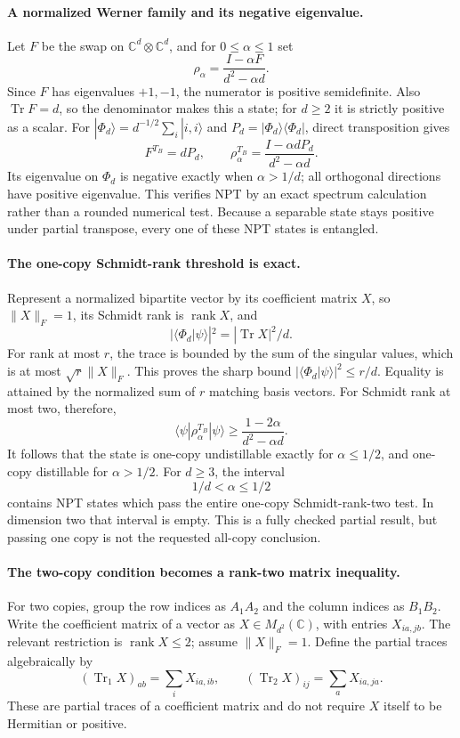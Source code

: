 \documentclass[11pt]{article}
\begin{document}
\paragraph{A normalized Werner family and its negative eigenvalue.}
Let $F$ be the swap on $\mathbb C^d\otimes\mathbb C^d$, and for
$0\le\alpha\le1$ set
\[
 \rho_\alpha=\frac{I-\alpha F}{d^2-\alpha d}.
\]
Since $F$ has eigenvalues $+1,-1$, the numerator is positive
semidefinite. Also $\operatorname{Tr}F=d$, so the denominator makes
this a state; for $d\ge2$ it is strictly positive as a scalar.
For $|\Phi_d\rangle=d^{-1/2}\sum_i|i,i\rangle$ and
$P_d=|\Phi_d\rangle\langle\Phi_d|$, direct transposition gives
\[
 F^{T_B}=dP_d,\qquad
 \rho_\alpha^{T_B}=\frac{I-\alpha dP_d}{d^2-\alpha d}.
\]
Its eigenvalue on $\Phi_d$ is negative exactly when $\alpha>1/d$;
all orthogonal directions have positive eigenvalue. This verifies NPT
by an exact spectrum calculation rather than a rounded numerical test.
Because a separable state stays positive under partial transpose, every
one of these NPT states is entangled.

\paragraph{The one-copy Schmidt-rank threshold is exact.}
Represent a normalized bipartite vector by its coefficient matrix $X$,
so $\|X\|_F=1$, its Schmidt rank is $\operatorname{rank}X$, and
\[
 |\langle\Phi_d|\psi\rangle|^2=|\operatorname{Tr}X|^2/d.
\]
For rank at most $r$, the trace is bounded by the sum of the singular
values, which is at most $\sqrt r\|X\|_F$. This proves the sharp
bound $|\langle\Phi_d|\psi\rangle|^2\le r/d$.
Equality is attained by the normalized sum of $r$ matching basis
vectors. For Schmidt rank at most two, therefore,
\[
 \langle\psi|\rho_\alpha^{T_B}|\psi\rangle
 \ge\frac{1-2\alpha}{d^2-\alpha d}.
\]
It follows that the state is one-copy undistillable exactly for
$\alpha\le1/2$, and one-copy distillable for $\alpha>1/2$.
For $d\ge3$, the interval
\[
                         1/d<\alpha\le1/2
\]
contains NPT states which pass the entire one-copy Schmidt-rank-two
test. In dimension two that interval is empty. This is a fully checked
partial result, but passing one copy is not the requested all-copy
conclusion.

\paragraph{The two-copy condition becomes a rank-two matrix inequality.}
For two copies, group the row indices as $A_1A_2$ and the column
indices as $B_1B_2$. Write the coefficient matrix of a vector as
$X\in M_{d^2}(\mathbb C)$, with entries $X_{ia,jb}$.
The relevant restriction is $\operatorname{rank}X\le2$; assume
$\|X\|_F=1$. Define the partial traces algebraically by
\[
 (\operatorname{Tr}_1X)_{ab}=\sum_iX_{ia,ib},\qquad
 (\operatorname{Tr}_2X)_{ij}=\sum_aX_{ia,ja}.
\]
These are partial traces of a coefficient matrix and do not require
$X$ itself to be Hermitian or positive.
\end{document}

